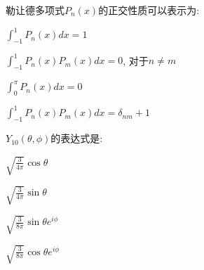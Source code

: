 \documentclass{njustexam}
\begin{document}
\begin{problem}
  勒让德多项式$P_n(x)$的正交性质可以表示为:
  \begin{abcd}
    \item $\int_{-1}^{1} P_n(x) dx = 1$

    \item $\int_{-1}^{1} P_n(x) P_m(x) dx = 0$, 对于$n \neq m$
    
    \item $\int_{0}^{\pi} P_n(x) dx = 0$
    
    \item $\int_{-1}^{1} P_n(x) P_m(x) dx = \delta_{nm} + 1$
  \end{abcd}
\end{problem}

\begin{problem}
  $Y_{10}(\theta,  \phi)$的表达式是:
\begin{abcd}
  \item $\sqrt{\frac{3}{4\pi}} \cos \theta$
  \item $\sqrt{\frac{3}{4\pi}} \sin \theta$
  \item $\sqrt{\frac{3}{8\pi}} \sin \theta e^{i\phi}$
  \item $\sqrt{\frac{3}{8\pi}} \cos \theta e^{i\phi}$
\end{abcd}
\end{problem}




\end{document}
